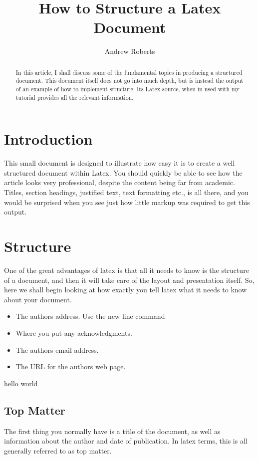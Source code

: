 

	\title{How to Structure a Latex Document}
	\author{Andrew Roberts}

	\begin{abstract}
		In this article, I shall discuss some of the fundamental topics in
		producing a structured document.  This document itself does not go into
		much depth, but is instead the output of an example of how to implement
		structure. Its Latex source, when in used with my tutorial
		provides all the relevant information.  \end{abstract}

	\section{Introduction}
	This small document is designed to illustrate how easy it is to create a
	well structured document within Latex.  You should quickly be able to
	see how the article looks very professional, despite the content being
	far from academic.  Titles, section headings, justified text, text
	formatting etc., is all there, and you would be surprised when you see
	just how little markup was required to get this output.

	\section{Structure}
	One of the great advantages of latex is that all it needs to know is
	the structure of a document, and then it will take care of the layout
	and presentation itself.  So, here we shall begin looking at how exactly
	you tell latex what it needs to know about your document.

	\begin{itemize}
		\item  The authors address.  Use
		the new line command
		\item Where you put any acknowledgments.
		\item The authors email address.
		\item The URL for the authors web page.
	\end{itemize}
	hello world

	\subsection{Top Matter}
	The first thing you normally have is a title of the document, as well as
	information about the author and date of publication. In latex terms,
	this is all generally referred to as top matter.

